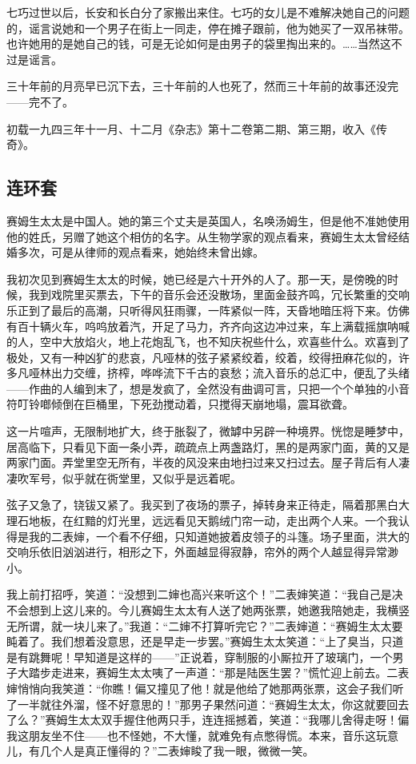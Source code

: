 \par 七巧过世以后，长安和长白分了家搬出来住。七巧的女儿是不难解决她自己的问题的，谣言说她和一个男子在街上一同走，停在摊子跟前，他为她买了一双吊袜带。也许她用的是她自己的钱，可是无论如何是由男子的袋里掏出来的。……当然这不过是谣言。
\par 三十年前的月亮早已沉下去，三十年前的人也死了，然而三十年前的故事还没完——完不了。
\par {}
\par *初载一九四三年十一月、十二月《杂志》第十二卷第二期、第三期，收入《传奇》。


\subsection{连环套}


\par 赛姆生太太是中国人。她的第三个丈夫是英国人，名唤汤姆生，但是他不准她使用他的姓氏，另赠了她这个相仿的名字。从生物学家的观点看来，赛姆生太太曾经结婚多次，可是从律师的观点看来，她始终未曾出嫁。
\par 我初次见到赛姆生太太的时候，她已经是六十开外的人了。那一天，是傍晚的时候，我到戏院里买票去，下午的音乐会还没散场，里面金鼓齐鸣，冗长繁重的交响乐正到了最后的高潮，只听得风狂雨骤，一阵紧似一阵，天昏地暗压将下来。仿佛有百十辆火车，呜呜放着汽，开足了马力，齐齐向这边冲过来，车上满载摇旗呐喊的人，空中大放焰火，地上花炮乱飞，也不知庆祝些什么，欢喜些什么。欢喜到了极处，又有一种凶犷的悲哀，凡哑林的弦子紧紧绞着，绞着，绞得扭麻花似的，许多凡哑林出力交缠，挤榨，哗哗流下千古的哀愁；流入音乐的总汇中，便乱了头绪——作曲的人编到末了，想是发疯了，全然没有曲调可言，只把一个个单独的小音符叮铃啷倾倒在巨桶里，下死劲搅动着，只搅得天崩地塌，震耳欲聋。
\par 这一片喧声，无限制地扩大，终于胀裂了，微罅中另辟一种境界。恍惚是睡梦中，居高临下，只看见下面一条小弄，疏疏点上两盏路灯，黑的是两家门面，黄的又是两家门面。弄堂里空无所有，半夜的风没来由地扫过来又扫过去。屋子背后有人凄凄吹军号，似乎就在衖堂里，又似乎是远着呢。
\par 弦子又急了，铙钹又紧了。我买到了夜场的票子，掉转身来正待走，隔着那黑白大理石地板，在红黯的灯光里，远远看见天鹅绒门帘一动，走出两个人来。一个我认得是我的二表婶，一个看不仔细，只知道她披着皮领子的斗篷。场子里面，洪大的交响乐依旧汹汹进行，相形之下，外面越显得寂静，帘外的两个人越显得异常渺小。
\par 我上前打招呼，笑道：“没想到二婶也高兴来听这个！”二表婶笑道：“我自己是决不会想到上这儿来的。今儿赛姆生太太有人送了她两张票，她邀我陪她走，我横竖无所谓，就一块儿来了。”我道：“二婶不打算听完它？”二表婶道：“赛姆生太太要盹着了。我们想着没意思，还是早走一步罢。”赛姆生太太笑道：“上了臭当，只道是有跳舞呢！早知道是这样的——”正说着，穿制服的小厮拉开了玻璃门，一个男子大踏步走进来，赛姆生太太咦了一声道：“那是陆医生罢？”慌忙迎上前去。二表婶悄悄向我笑道：“你瞧！偏又撞见了他！就是他给了她那两张票，这会子我们听了一半就往外溜，怪不好意思的！”那男子果然问道：“赛姆生太太，你这就要回去了么？”赛姆生太太双手握住他两只手，连连摇撼着，笑道：“我哪儿舍得走呀！偏我这朋友坐不住——也不怪她，不大懂，就难免有点憋得慌。本来，音乐这玩意儿，有几个人是真正懂得的？”二表婶睃了我一眼，微微一笑。
